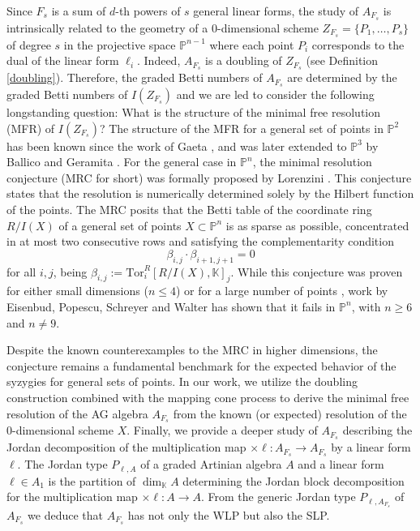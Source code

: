 \documentclass[12pt,twoside]{amsart}
\numberwithin{equation}{section} \hyphenation{semi-stable}
\newcommand {\PP}{\mathbb{P}}
\newcommand{\K}{\mathbb{K}}
\theoremstyle{definition}
\begin{document}
  Since $F_s$ is a sum of $d$-th powers of $s$ general linear forms, the study of $A_{F_s}$ is intrinsically related to the geometry of a 0-dimensional scheme $Z_{F_s} = \{P_1, \dots, P_s\}$ of degree $s$ in the projective space $\mathbb{P}^{n-1}$ where each point $P_i$ corresponds to the dual of the linear form $\ell_i$. Indeed, $A_{F_s}$ is a doubling of $Z_{F_s}$ (see Definition \ref{doubling}). Therefore, the graded Betti numbers of $A_{F_s}$ are determined by the graded Betti numbers of  $I(Z_{F_s})$ and we are led to consider the following longstanding question: What is the structure of the minimal free resolution (MFR) of $I(Z_{F_s})$?
The structure of the MFR for a general set of points in $\PP^2$ has been known since the work of Gaeta \cite{G1}, and was later extended to $\mathbb{P}^3$ by Ballico and Geramita \cite{BG}. For the general case in $\mathbb{P}^n$, the minimal resolution conjecture (MRC for short) was formally proposed by Lorenzini \cite{L}. This conjecture states that the resolution is numerically determined solely by the Hilbert function of the points. The MRC posits that the Betti table of the coordinate ring $R/I(X)$ of a general set of points $X\subset \PP^n$ is as sparse as possible, concentrated in at most two consecutive rows and satisfying the complementarity condition
$$\beta_{i, j} \cdot \beta_{i+1, j+1} = 0$$
for all $i, j$, being $\beta_{i,j} := \text{Tor}_i^R[R/I(X), \mathbb{K}]_{j}$. While this conjecture was proven for either small dimensions ($n\le 4$) or for a large number of points  \cite{HS}, work by Eisenbud, Popescu, Schreyer and Walter \cite{EPSW} has shown that it fails in $\mathbb{P}^n$, with $n \geq 6$ and $n \neq 9$.

Despite the known counterexamples to the MRC in higher dimensions, the conjecture remains a fundamental benchmark for the expected behavior of the syzygies for general sets of points. In our work, we utilize the doubling construction combined with the mapping cone process to derive the minimal free resolution of the AG algebra $A_{F_s}$ from the known (or expected) resolution of the 0-dimensional scheme $X$. Finally, we provide a deeper study of $A_{F_s}$ describing the Jordan decomposition
of the multiplication map $\times \ell :A_{F_s}\longrightarrow A_{F_s}$ by a linear form $\ell$.
The Jordan type $P_{\ell,A}$ of a graded Artinian algebra
$A$ and a linear form $\ell \in A_1$ is the partition of $\dim_{\K} A$ determining the
Jordan block decomposition for the multiplication map $\times \ell :A\longrightarrow A$. From the generic Jordan type $P_{\ell,A_{F_s}}$ of $A_{F_s}$ we deduce that $A_{F_s}$ has not only the WLP but also the SLP.
\end{document}
